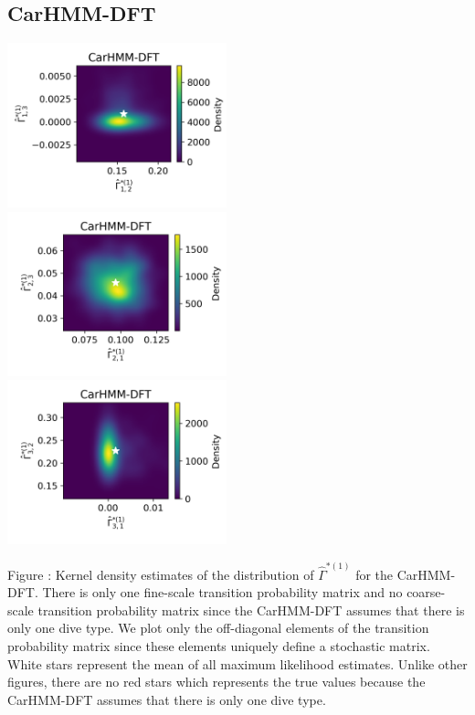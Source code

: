 \documentclass{article}
\begin{document}
        \subsection{CarHMM-DFT}
        \begin{center}
        \includegraphics[width=2.5in]{../Plots/hmm_FV_Gamma_density_0_row_0.png} \\
        \includegraphics[width=2.5in]{../Plots/hmm_FV_Gamma_density_0_row_1.png} \\
        \includegraphics[width=2.5in]{../Plots/hmm_FV_Gamma_density_0_row_2.png} \\
        \end{center}
        
        \noindent Figure : Kernel density estimates of the distribution of $\hat \Gamma^{*(1)}$ for the CarHMM-DFT. There is only one fine-scale transition probability matrix and no coarse-scale transition probability matrix since the CarHMM-DFT assumes that there is only one dive type. We plot only the off-diagonal elements of the transition probability matrix since these elements uniquely define a stochastic matrix. White stars represent the mean of all maximum likelihood estimates. Unlike other figures, there are no red stars which represents the true values because the CarHMM-DFT assumes that there is only one dive type.
        \addtocounter{fignum}{1}
\end{document}
